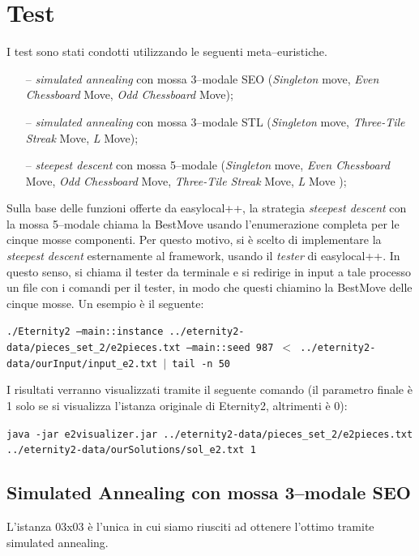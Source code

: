 
\section{Test} %
\label{sec:test}
    
    I test sono stati condotti utilizzando le seguenti meta--euristiche.
    \begin{itemize}
        \item[--] \emph{simulated annealing} con mossa 3--modale SEO (\emph{Singleton} move, \emph{Even Chessboard} Move, \emph{Odd Chessboard} Move);
        \item[--] \emph{simulated annealing} con mossa 3--modale STL (\emph{Singleton} move, \emph{Three-Tile Streak} Move, \emph{L} Move);
        \item[--] \emph{steepest descent} con mossa 5--modale (\emph{Singleton} move, \emph{Even Chessboard} Move, \emph{Odd Chessboard} Move, \emph{Three-Tile Streak} Move, \emph{L} Move );
    \end{itemize}

    Sulla base delle funzioni offerte da easylocal++, la strategia \emph{steepest descent} con la mossa 5--modale chiama la BestMove usando l'enumerazione completa per le cinque mosse componenti. Per questo motivo, si è scelto di implementare la \emph{steepest descent} esternamente al framework, usando il \emph{tester} di easylocal++. In questo senso, si chiama il tester da terminale e si redirige in input a tale processo un file con i comandi per il tester, in modo che questi chiamino la BestMove delle cinque mosse. Un esempio è il seguente:

    \begin{center}
	\texttt{./Eternity2 --main::instance ../eternity2-data/pieces\_set\_2/e2pieces.txt --main::seed 987 $<$ ../eternity2-data/ourInput/input\_e2.txt $\mid$ tail -n 50}
	\end{center}

	I risultati verranno visualizzati tramite il seguente comando (il parametro finale è 1 solo se si visualizza l'istanza originale di Eternity2, altrimenti è 0):

	\begin{center}
	\texttt{java -jar e2visualizer.jar ../eternity2-data/pieces\_set\_2/e2pieces.txt ../eternity2-data/ourSolutions/sol\_e2.txt 1}
	\end{center}
	




	\subsection{Simulated Annealing con mossa 3--modale SEO}
	L'istanza 03x03 è l'unica in cui siamo riusciti ad ottenere l'ottimo tramite simulated annealing.

